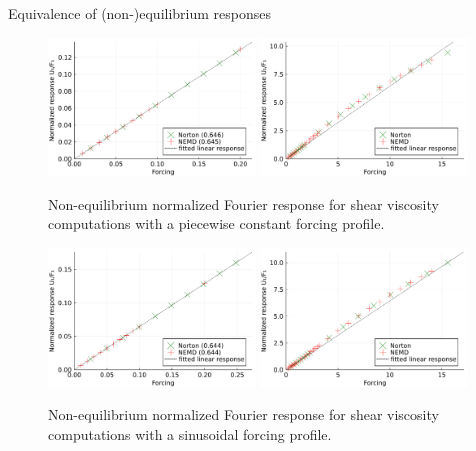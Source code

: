 \begin{subsection}{Equivalence of (non-)equilibrium responses}
    \begin{figure}
        \centering
        \includegraphics[width=0.49\textwidth]{figures/04/shears_lin_constant.pdf}
        \includegraphics[width=0.49\textwidth]{figures/04/shears_nonlin_constant.pdf}
        \caption[]{Non-equilibrium normalized Fourier response for shear viscosity computations with a piecewise constant forcing profile.}
        \label{04:fig:sv_constant}
    \end{figure}
        \begin{figure}
        \centering
        \includegraphics[width=0.49\textwidth]{figures/04/shears_lin_sinusoidal.pdf}
        \includegraphics[width=0.49\textwidth]{figures/04/shears_nonlin_sinusoidal.pdf}
        \caption[]{Non-equilibrium normalized Fourier response for shear viscosity computations with a sinusoidal forcing profile.}
        \label{04:fig:sv_sinusoidal}
    \end{figure}
\end{subsection}
    
